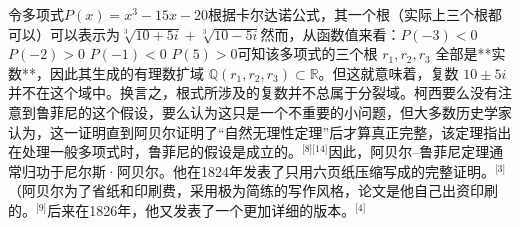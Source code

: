 令多项式$P(x) = x^3 - 15x - 20$根据卡尔达诺公式，其一个根（实际上三个根都可以）可以表示为$\sqrt[3]{10 + 5i} + \sqrt[3]{10 - 5i}$然而，从函数值来看：$P(-3) < 0$ $P(-2) > 0$ $P(-1) < 0$ $P(5) > 0$可知该多项式的三个根 $r_1, r_2, r_3$ 全部是**实数**，因此其生成的有理数扩域 $\mathbb{Q}(r_1, r_2, r_3) \subset \mathbb{R}$。但这就意味着，复数 $10 \pm 5i$ 并不在这个域中。换言之，根式所涉及的复数并不总属于分裂域。柯西要么没有注意到鲁菲尼的这个假设，要么认为这只是一个不重要的小问题，但大多数历史学家认为，这一证明直到阿贝尔证明了“自然无理性定理”后才算真正完整，该定理指出在处理一般多项式时，鲁菲尼的假设是成立的。\(^\text{[8][14]}\)因此，阿贝尔–鲁菲尼定理通常归功于尼尔斯·阿贝尔。他在1824年发表了只用六页纸压缩写成的完整证明。\(^\text{[3]}\)（阿贝尔为了省纸和印刷费，采用极为简练的写作风格，论文是他自己出资印刷的。\(^\text{[9]}\)后来在1826年，他又发表了一个更加详细的版本。\(^\text{[4]}\)
